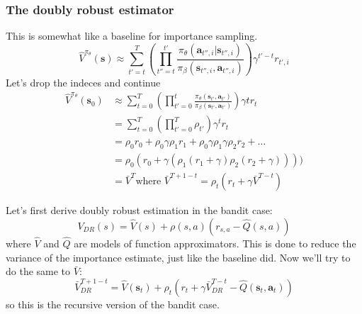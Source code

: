 \documentclass{report}
\begin{document}
\subsubsection{The doubly robust estimator}
This is somewhat like a baseline for importance sampling.
\begin{equation}
\hat{V}^{\pi_\theta}(\bm{s}) \approx
\sum_{t'=t}^{T} \left( \prod_{t''=t}^{t'}  \frac{\pi_{ \theta }(\bm{a}_{t'',i}| \bm{s}_{t'',i} )}{\pi_{ \beta }(\bm{s}_{t'',i}, \bm{a}_{t'',i} )} \right) 
\gamma^{ t'-t } r_{ t',i }
\end{equation}
Let's drop the indeces and continue
\begin{align}
\hat{V}^{\pi_\theta}(\bm{s}_{ 0 }) &\approx
\sum_{t=0}^{T}
\left(   
\prod_{t'=0}^{t} \frac{\pi_{ \theta  }(\bm{s}_{t'}, \bm{a}_{t'} )}{\pi_{ \beta }(\bm{s}_{t'}, \bm{a}_{t'} )}  
\right) \gamma{t}r_{ t }  \\
&= 
\sum_{t=0}^{T} \left( \prod_{t'=0}^{T} \rho_{ t' }  \right) \gamma^{ t } r_{ t } \\
&=
\rho_{ 0 }r_{ 0 } + \rho_{ 0 }\gamma \rho_{ 1 }r_{ 1 } + \rho_{ 0 }\gamma \rho_{ 1 }\gamma \rho_{ 2 }r_{ 2 } + \dots \\
&=
\rho_{ 0 } (r_{ 0 } + \gamma (\rho_{ 1 } (r_{ 1 } + \gamma )\rho_{ 2 } (r_{ 2 } + \gamma)))) \\
&=
\bar{V}^{ T } \text{where } \bar{V}^{ T+1-t } = \rho_{ t } (r_{ t } + \gamma \bar{V}^{ T-t })
\end{align}

Let's first derive doubly robust estimation in the bandit case:
\begin{equation}
		V_{ DR } (s) = \hat{V} (s) + \rho (s,a) (r_{ s,a } - \hat{Q} (s,a))
\end{equation}
where $ \hat{V}  $ and $ \hat{Q}  $ are models of function approximators.
This is done to reduce the variance of the importance estimate,
just like the baseline did.
Now we'll try to do the same to $ \bar{V}  $:
\begin{equation}
		\bar{V}^{ T+1-t }_{ DR } = \hat{V} (\bm{s}_{t}) + \rho_{ t } (r_{ t } + \gamma \bar{V}_{ DR }^{ T-t } - \hat{Q}(\bm{s}_{t}, \bm{a}_{t} ))
\end{equation}
so this is the recursive version of the bandit case.
\end{document}
